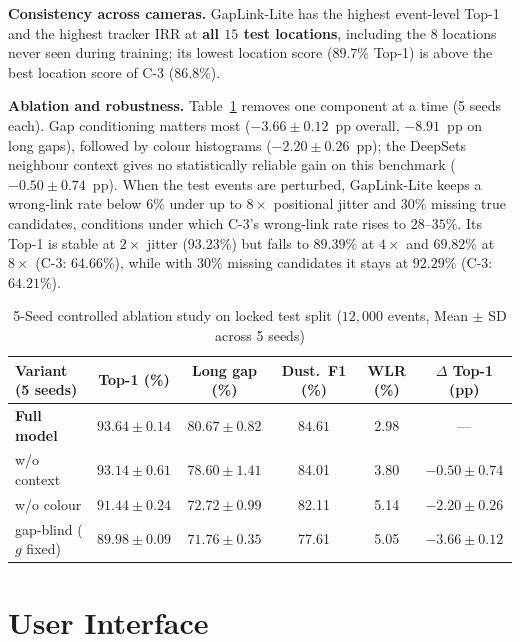 \textbf{Consistency across cameras.} GapLink-Lite has the highest event-level Top-1 and the highest tracker IRR at \textbf{all $15$ test locations}, including the $8$ locations never seen during training; its lowest location score ($89.7\%$ Top-1) is above the best location score of C-3 ($86.8\%$).

\textbf{Ablation and robustness.} Table~\ref{tab:ablation_results} removes one component at a time (5 seeds each). Gap conditioning matters most ($-3.66 \pm 0.12$~pp overall, $-8.91$~pp on long gaps), followed by colour histograms ($-2.20 \pm 0.26$~pp); the DeepSets neighbour context gives no statistically reliable gain on this benchmark ($-0.50 \pm 0.74$~pp). When the test events are perturbed, GapLink-Lite keeps a wrong-link rate below $6\%$ under up to $8\times$ positional jitter and $30\%$ missing true candidates, conditions under which C-3's wrong-link rate rises to $28$--$35\%$. Its Top-1 is stable at $2\times$ jitter ($93.23\%$) but falls to $89.39\%$ at $4\times$ and $69.82\%$ at $8\times$ (C-3: $64.66\%$), while with $30\%$ missing candidates it stays at $92.29\%$ (C-3: $64.21\%$).

\begin{table}[H]
    \centering
    \caption{5-Seed controlled ablation study on locked test split ($12{,}000$ events, Mean $\pm$ SD across 5 seeds)}
    \label{tab:ablation_results}
    \small\setlength{\tabcolsep}{3.0pt}
    \begin{tabularx}{\textwidth}{X c c c c c}
        \toprule
        \textbf{Variant (5 seeds)} & \textbf{Top-1 (\%)} & \textbf{Long gap (\%)} & \textbf{Dust.\ F1 (\%)} & \textbf{WLR (\%)} & \textbf{$\Delta$ Top-1 (pp)} \\
        \midrule
        \textbf{Full model} & $\mathbf{93.64\pm0.14}$ & $\mathbf{80.67\pm0.82}$ & $\mathbf{84.61}$ & $\mathbf{2.98}$ & --- \\
        w/o context & $93.14\pm0.61$ & $78.60\pm1.41$ & 84.01 & 3.80 & $-0.50\pm0.74$ \\
        w/o colour & $91.44\pm0.24$ & $72.72\pm0.99$ & 82.11 & 5.14 & $-2.20\pm0.26$ \\
        gap-blind ($g$ fixed) & $89.98\pm0.09$ & $71.76\pm0.35$ & 77.61 & 5.05 & $-3.66\pm0.12$ \\
        \bottomrule
    \end{tabularx}
\end{table}

\section{User Interface}
\label{sec:user_interface}

